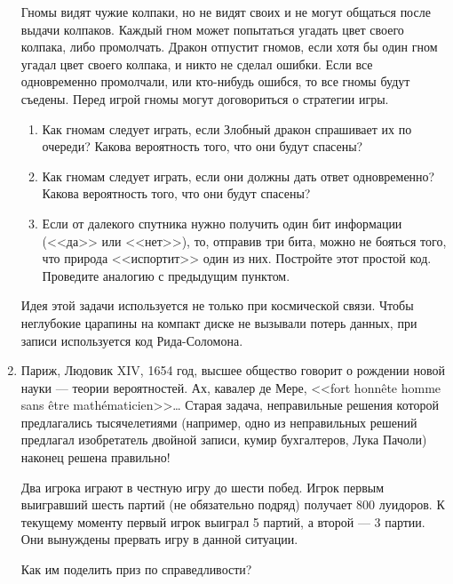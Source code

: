 \documentclass[nobib]{tufte-handout}
\begin{document}
\begin{enumerate}
Гномы видят чужие колпаки, но не видят своих и не могут общаться после выдачи колпаков. Каждый гном может попытаться угадать цвет своего колпака, либо промолчать. Дракон отпустит гномов, если хотя бы один гном угадал цвет своего колпака, и никто не сделал ошибки. Если все одновременно промолчали, или кто-нибудь ошибся, то все гномы будут съедены. Перед игрой гномы могут договориться о стратегии игры.
\begin{enumerate}
\item Как гномам следует играть, если Злобный дракон спрашивает их по очереди? Какова вероятность того, что они будут спасены?
\item Как гномам следует играть, если они должны дать ответ одновременно? Какова вероятность того, что они будут спасены?
\item Если от далекого спутника нужно получить один бит информации (<<да>> или <<нет>>), то, отправив три бита, можно не бояться того, что природа <<испортит>> один из них. Постройте этот простой код. Проведите аналогию с предыдущим пунктом. 
\end{enumerate}
Идея этой задачи используется не только при космической связи. Чтобы неглубокие царапины на компакт диске не вызывали потерь данных, при записи используется код Рида-Соломона.

\item Париж, Людовик XIV, 1654 год, высшее общество говорит о рождении новой науки --- теории вероятностей. Ах, кавалер де Мере, <<fort honnête homme sans être mathématicien>>\ldots {} Старая задача, неправильные решения которой предлагались тысячелетиями (например, одно из неправильных решений предлагал изобретатель двойной записи, кумир бухгалтеров, Лука Пачоли) наконец решена правильно!


Два игрока играют в честную игру до шести побед. Игрок первым выигравший шесть партий (не обязательно подряд) получает 800 луидоров. К текущему моменту первый игрок выиграл 5 партий, а второй --- 3 партии. Они вынуждены прервать игру в данной ситуации.


Как им поделить приз по справедливости? 


\end{enumerate}
\end{document}
